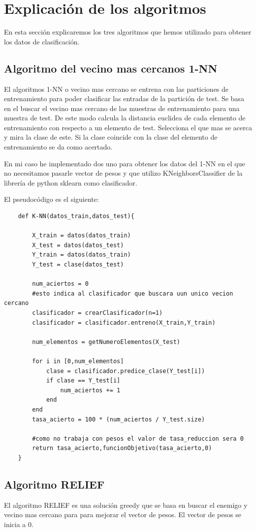 \documentclass[titlepage]{article}
\begin{document}
	\section{Explicación de los algoritmos}
	En esta sección explicaremos los tres algoritmos que hemos utilizado para obtener los datos de clasificación.
	
	\subsection{Algoritmo del vecino mas cercanos 1-NN}
	El algoritmos 1-NN o vecino mas cercano se entrena con las particiones de entrenamiento para poder clasificar las entradas de la partición de test. Se basa en el buscar el vecino mas cercano de las muestras de entrenamiento para una muestra de test. De este modo calcula la distancia euclidea de cada elemento de entrenamiento con respecto a un elemento de test. Selecciona el que mas se acerca y mira la clase de este. Si la clase coincide con la clase del elemento de entrenamiento se da como acertado.
	
	En mi caso he implementado dos uno para obtener los datos del 1-NN en el que no necesitamos pasarle vector de pesos y que utilizo KNeighborsClassifier de la librería de python sklearn como clasificador.
	
	El pseudocódigo es el siguiente:
	\begin{lstlisting}
	def K-NN(datos_train,datos_test){
	
		X_train = datos(datos_train)
		X_test = datos(datos_test)
		Y_train = datos(datos_train)
		Y_test = clase(datos_test)
		
		num_aciertos = 0
		#esto indica al clasificador que buscara uun unico vecion cercano
		clasificador = crearClasificador(n=1)
		clasificador = clasificador.entreno(X_train,Y_train)
		
		num_elementos = getNumeroElementos(X_test)
		
		for i in [0,num_elementos]
			clase = clasificador.predice_clase(Y_test[i])
			if clase == Y_test[i]
				num_aciertos += 1
			end
		end
		tasa_acierto = 100 * (num_aciertos / Y_test.size)
		
		#como no trabaja con pesos el valor de tasa_reduccion sera 0
		return tasa_acierto,funcionObjetivo(tasa_acierto,0)
	}
	\end{lstlisting}
	\newpage
	
	\subsection{Algoritmo RELIEF}
	El algoritmo RELIEF es una solución greedy que se basa en buscar el enemigo y vecino mas cercano para para mejorar el vector de pesos. El vector de pesos se inicia a 0.
	
\end{document}
